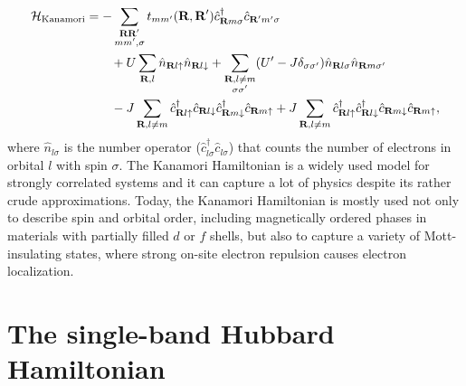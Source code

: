 \documentclass[../../main.tex]{subfiles}
\begin{document}
\begin{align}
\begin{split}
	\mathcal{H}_{\text{Kanamori}}&=-\sum_{\substack{\textbf{R}\textbf{R}'\\ mm',\sigma}}t_{mm'}(\textbf{R},\textbf{R}')\hat c^{\dagger}_{\textbf{R}m\sigma}\hat c_{\textbf{R}'m'\sigma}\\
	&\qquad +U\sum_{\textbf{R},l} \hat n_{\textbf{R}l\uparrow}\hat n_{\textbf{R}l\downarrow}+\sum_{\substack{\textbf{R},l\neq m\\\sigma\sigma'}}(U'-J\delta_{\sigma\sigma'}) \hat n_{\textbf{R}l\sigma} \hat n_{\textbf{R}m\sigma'}\\
	&\qquad -J\sum_{\textbf{R},l\neq m}\hat c^\dagger_{\textbf{R}l\uparrow}\hat c_{\textbf{R}l\downarrow}\hat c^\dagger_{\textbf{R}m\downarrow}\hat c_{\textbf{R}m\uparrow}+J\sum_{\textbf{R},l\neq m}\hat c^\dagger_{\textbf{R}l\uparrow}\hat c^\dagger_{\textbf{R}l\downarrow}\hat c_{\textbf{R}m\downarrow}\hat c_{\textbf{R}m\uparrow},
\end{split}
\end{align}
where $\hat n_{l\sigma}$ is the number operator ($\hat c^\dagger_{l\sigma}\hat c_{l\sigma}$) that counts the number of electrons in orbital $l$ with spin $\sigma$. The Kanamori Hamiltonian is a widely used model for strongly correlated systems and it can capture a lot of physics despite its rather crude approximations. Today, the Kanamori Hamiltonian is mostly used not only to describe spin and orbital order, including magnetically ordered phases in materials with partially filled $d$ or $f$ shells, but also to capture a variety of Mott-insulating states, where strong on-site electron repulsion causes electron localization.

\section{The single-band Hubbard Hamiltonian}
\end{document}
